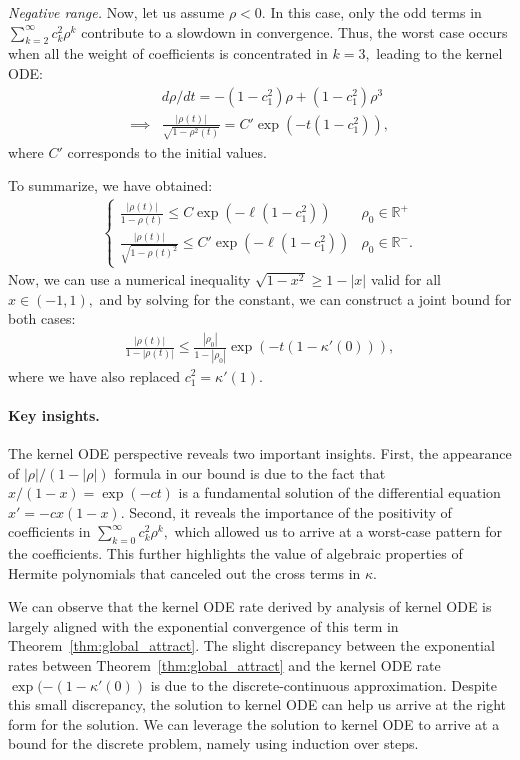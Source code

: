 \documentclass[twoside]{article}
\newcommand{\R}{\mathbb{R}}
\theoremstyle{definition}
\begin{document}
\textit{Negative range.}
Now, let us assume $\rho<0.$ In this case, only the odd terms in $\sum_{k=2}^\infty c_k^2 \rho^k$ contribute to a slowdown in convergence. Thus, the worst case occurs when all the weight of coefficients is concentrated in $k=3,$ leading to the kernel ODE:
\begin{align*}
&d\rho/dt = -(1-c_1^2)\rho + (1-c_1^2) \rho^3\\
\implies &\frac{|\rho(t)|}{\sqrt{1-\rho^2(t)}} = C' \exp(-t(1-c_1^2)),
\end{align*}
where $C'$ corresponds to the initial values. 

To summarize, we have obtained:
\begin{align*}
    \begin{cases}
        \frac{|\rho(t)|}{1-\rho(t)} \le C \exp(-\ell(1-c_1^2)) & \rho_0 \in \R^+\\
        \frac{|\rho(t)|}{\sqrt{1-\rho(t)^2}}\le C' \exp(-\ell(1-c_1^2)) & \rho_0\in\R^-.
    \end{cases}
\end{align*}
Now, we can use a numerical inequality $\sqrt{1-x^2} \ge 1-|x|$ valid for all $x\in(-1,1),$ and by solving for the constant, we can construct a joint bound for both cases:
\begin{align*}
    \frac{|\rho(t)|}{1-|\rho(t)|} \le \frac{|\rho_0|}{1-|\rho_0|} \exp(-t (1-\kappa'(0))), 
\end{align*}
where we have also replaced $c_1^2=\kappa'(1).$  

\paragraph{Key insights.}
The kernel ODE perspective reveals two important insights. 
First, the appearance of $|\rho|/(1-|\rho|)$ formula in our bound is due to the fact that $x/(1-x) = \exp( -c t) $ is a fundamental solution of the differential equation $x' = - c x(1-x).$ Second, it reveals the importance of the positivity of coefficients in $\sum_{k=0}^\infty c_k^2\rho^k,$ which allowed us to arrive at a worst-case pattern for the coefficients. 
This further highlights the value of algebraic properties of Hermite polynomials that canceled out the cross terms in $\kappa.$

We can observe that the kernel ODE rate derived by analysis of kernel ODE is largely aligned with the exponential convergence of this term in Theorem~\ref{thm:global_attract}. The slight discrepancy between the exponential rates between Theorem~\ref{thm:global_attract} and the kernel ODE rate $\exp(-(1-\kappa'(0))$ is due to the discrete-continuous approximation. Despite this small discrepancy, the solution to kernel ODE can help us arrive at the right form for the solution. We can leverage the solution to kernel ODE to arrive at a bound for the discrete problem, namely using induction over steps.
\end{document}
